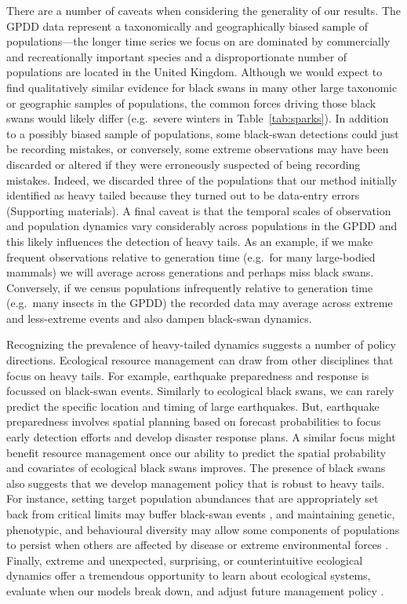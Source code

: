 There are a number of caveats when considering the generality of our results.
The GPDD data represent a taxonomically and geographically biased sample of
populations---the longer time series we focus on are dominated by commercially
and recreationally important species and a disproportionate number of
populations are located in the United Kingdom. Although we would expect to
find qualitatively similar evidence for black swans in many other large
taxonomic or geographic samples of populations, the common forces driving
those black swans would likely differ (e.g.~severe winters in
Table~\ref{tab:sparks}). In addition to a possibly biased sample of
populations, some black-swan detections could just be recording mistakes, or
conversely, some extreme observations may have been discarded or altered if
they were erroneously suspected of being recording mistakes. Indeed, we
discarded three of the populations that our method initially identified as
heavy tailed because they turned out to be data-entry errors (Supporting
materials). A final caveat is that the temporal scales of observation and
population dynamics vary considerably across populations in the GPDD and this
likely influences the detection of heavy tails. As an example, if we make
frequent observations relative to generation time (e.g.~for many large-bodied
mammals) we will average across generations and perhaps miss black swans.
Conversely, if we census populations infrequently relative to generation time
(e.g.~many insects in the GPDD) the recorded data may average across extreme
and less-extreme events and also dampen black-swan dynamics.

Recognizing the prevalence of heavy-tailed dynamics suggests a number of
policy directions. Ecological resource management can draw from other
disciplines that focus on heavy tails. For example, earthquake preparedness
and response is focussed on black-swan events. Similarly to ecological black
swans, we can rarely predict the specific location and timing of large
earthquakes. But, earthquake preparedness involves spatial planning based on
forecast probabilities to focus early detection efforts and develop disaster
response plans. A similar focus might benefit resource management once our
ability to predict the spatial probability and covariates of ecological black
swans improves. The presence of black swans also suggests that we develop
management policy that is robust to heavy tails. For instance, setting target
population abundances that are appropriately set back from critical limits may
buffer black-swan events \citep[e.g.][]{caddy1996}, and maintaining genetic,
phenotypic, and behavioural diversity may allow some components of populations
to persist when others are affected by disease or extreme environmental forces
\citep[e.g.][]{hilborn2003, schindler2010, anderson2014}. Finally, extreme and
unexpected, surprising, or counterintuitive ecological dynamics offer a
tremendous opportunity to learn about ecological systems, evaluate when our
models break down, and adjust future management policy \citep{doak2008,
  pine-iii2009, lindenmayer2010}.


